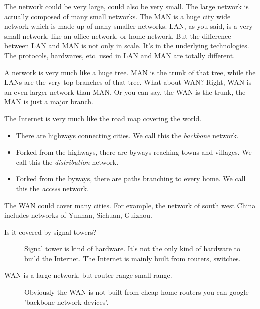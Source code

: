 \documentclass{article}
\begin{document}
The network could be very large, could also be very small. The large network is actually
composed of many small networks. The MAN is a huge city wide network which is made up of
many smaller networks. LAN, as you said, is a very small network, like an office network,
or home network. But the difference between LAN and MAN is not only in scale.  It's in the
underlying technologies. The protocols, hardwares, etc. used in LAN and MAN are totally
different.

A network is very much like a huge tree. MAN is the trunk of that tree, while the LANs are
the very top branches of that tree. What about WAN?  Right, WAN is an even larger network
than MAN. Or you can say, the WAN is the trunk, the MAN is just a major branch.

The Internet is very much like the road map covering the world.
\begin{itemize}
\item There are highways connecting cities. We call this the \emph{backbone} network.
\item Forked from the highways, there are byways reaching towns and villages. We call this
  the \emph{distribution} network.
\item Forked from the byways, there are paths branching to every home. We call this the
  \emph{access} network.
\end{itemize}

The WAN could cover many cities. For example, the network of south west China includes
networks of Yunnan, Sichuan, Guizhou.  


\begin{description}
\item[Is it covered by signal towers?] Signal tower is kind of hardware. It's not the only
  kind of hardware to build the Internet.  The Internet is mainly built from routers,
  switches.
\item[WAN is a large network, but router range small range.] Obviously the WAN is not
  built from cheap home routers you can google 'backbone network devices'.
\end{description}
\end{document}
